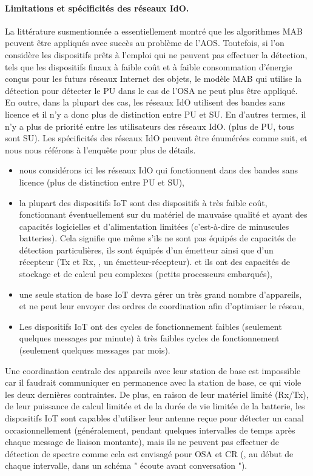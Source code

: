 \begin{resume_fr}
\paragraph{Limitations et spécificités des réseaux IdO.}
%
La littérature susmentionnée a essentiellement montré que les algorithmes MAB peuvent être appliqués avec succès au problème de l'AOS.
Toutefois, si l'on considère les dispositifs prêts à l'emploi qui ne peuvent pas effectuer la détection, tels que les dispositifs finaux à faible coût et à faible consommation d'énergie conçus pour les futurs réseaux Internet des objets, le modèle MAB qui utilise la détection pour détecter le PU dans le cas de l'OSA ne peut plus être appliqué.
En outre, dans la plupart des cas, les réseaux IdO utilisent des bandes sans licence et il n'y a donc plus de distinction entre PU et SU.
En d'autres termes, il n'y a plus de priorité entre les utilisateurs des réseaux IdO.
(plus de PU, tous sont SU).
%
Les spécificités des réseaux IdO peuvent être énumérées comme suit,
et nous nous référons à l'enquête \cite{Centenaro16} pour plus de détails.
%
\begin{itemize}\tightlist
    \item
    nous considérons ici les réseaux IdO qui fonctionnent dans des bandes sans licence (plus de distinction entre PU et SU),
    \item
    la plupart des dispositifs IoT sont des dispositifs à très faible coût, fonctionnant éventuellement sur du matériel de mauvaise qualité et ayant des capacités logicielles et d'alimentation limitées (c'est-à-dire de minuscules batteries).
    Cela signifie que même s'ils ne sont pas équipés de capacités de détection particulières,
    ils sont équipés d'un émetteur ainsi que d'un récepteur (Tx et Rx, \ie, un émetteur-récepteur).
    et ils ont des capacités de stockage et de calcul peu complexes (petits processeurs embarqués),
    \item
    une seule station de base IoT devra gérer un très grand nombre d'appareils,
    et ne peut leur envoyer des ordres de coordination afin d'optimiser le réseau,
    \item
    Les dispositifs IoT ont des cycles de fonctionnement faibles (seulement quelques messages par minute) à très faibles cycles de fonctionnement (seulement quelques messages par mois).
\end{itemize}

Une coordination centrale des appareils avec leur station de base est impossible car il faudrait communiquer en permanence avec la station de base, ce qui viole les deux dernières contraintes.
%
De plus, en raison de leur matériel limité (Rx/Tx), de leur puissance de calcul limitée et de la durée de vie limitée de la batterie, les dispositifs IoT sont capables d'utiliser leur antenne reçue pour détecter un canal occasionnellement (généralement, pendant quelques intervalles de temps après chaque message de liaison montante), mais ils ne peuvent pas effectuer de détection de spectre comme cela est envisagé pour OSA et CR (\ie, au début de chaque intervalle, dans un schéma " écoute avant conversation ").


\end{resume_fr}
